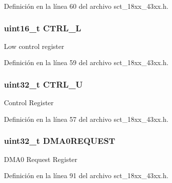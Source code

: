 Definición en la línea 60 del archivo sct\+\_\+18xx\+\_\+43xx.\+h.

\subsubsection[{\texorpdfstring{C\+T\+R\+L\+\_\+L}{CTRL_L}}]{ uint16\+\_\+t C\+T\+R\+L\+\_\+L}\hypertarget{struct_l_p_c___s_c_t___t_a42dae746c8f5aaaa5f392ec6c6c20ce8}{}\label{struct_l_p_c___s_c_t___t_a42dae746c8f5aaaa5f392ec6c6c20ce8}
Low control register 

Definición en la línea 59 del archivo sct\+\_\+18xx\+\_\+43xx.\+h.

\subsubsection[{\texorpdfstring{C\+T\+R\+L\+\_\+U}{CTRL_U}}]{ uint32\+\_\+t C\+T\+R\+L\+\_\+U}\hypertarget{struct_l_p_c___s_c_t___t_a7a1ecdee35c5253f466a7f1d777809bb}{}\label{struct_l_p_c___s_c_t___t_a7a1ecdee35c5253f466a7f1d777809bb}
Control Register 

Definición en la línea 57 del archivo sct\+\_\+18xx\+\_\+43xx.\+h.

\subsubsection[{\texorpdfstring{D\+M\+A0\+R\+E\+Q\+U\+E\+ST}{DMA0REQUEST}}]{ uint32\+\_\+t D\+M\+A0\+R\+E\+Q\+U\+E\+ST}\hypertarget{struct_l_p_c___s_c_t___t_a302d0b6a25634653cb7c5ed7a20420a8}{}\label{struct_l_p_c___s_c_t___t_a302d0b6a25634653cb7c5ed7a20420a8}
D\+M\+A0 Request Register 

Definición en la línea 91 del archivo sct\+\_\+18xx\+\_\+43xx.\+h.

